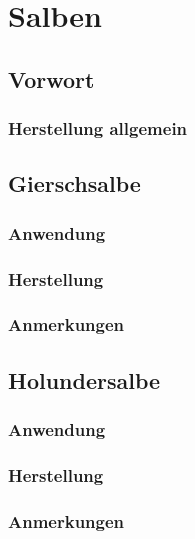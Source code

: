 \chapter{Salben}



\section{Vorwort}

\subsection{Herstellung allgemein}



\section{Gierschsalbe}

\subsection{Anwendung}

\subsection{Herstellung}

\subsection{Anmerkungen}





\section{Holundersalbe}

\subsection{Anwendung}

\subsection{Herstellung}

\subsection{Anmerkungen}
